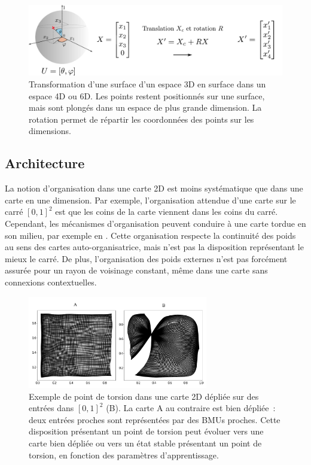 \documentclass[../main]{subfiles}
\begin{document}
\begin{figure}
	\includegraphics[width=\textwidth]{sphere_inputs.pdf}
	\caption{Transformation d'une surface d'un espace 3D en surface dans un espace 4D ou 6D. Les points restent positionnés sur une surface, mais sont plongés dans un espace de plus grande dimension. La rotation permet de répartir les coordonnées des points sur les dimensions. \label{fig:sphere_inputs}}
\end{figure}

\subsection{Architecture}

La notion d'organisation dans une carte 2D est moins systématique que dans une carte en une dimension. Par exemple, l'organisation attendue d'une carte sur le carré $[0,1]^2$ est que les coins de la carte viennent dans les coins du carré. 
Cependant, les mécanismes d'organisation peuvent conduire à une carte tordue en son milieu, par exemple en \label{fig:torsion}. Cette organisation respecte la continuité des poids au sens des cartes auto-organisatrice, mais n'est pas la disposition représentant le mieux le carré.
De plus, l'organisation des poids externes n'est pas forcément assurée pour un rayon de voisinage constant, même dans une carte sans connexions contextuelles. 

\begin{figure}
	\centering\includegraphics[width=0.7\textwidth]{we_cub_example.pdf}
	\caption{Exemple de point de torsion dans une carte 2D dépliée sur des entrées dans $[0,1]^2$ (B). La carte A au contraire est bien dépliée~: deux entrées proches sont représentées par des BMUs proches. Cette disposition présentant un point de torsion peut évoluer vers une carte bien dépliée ou vers un état stable présentant un point de torsion, en fonction des paramètres d'apprentissage. \label{fig:torsion}
	}
\end{figure}
\end{document}
